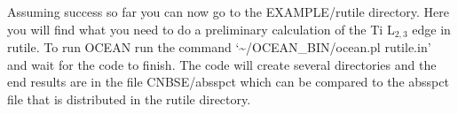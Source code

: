 \documentclass[11pt]{report}
\begin{document}
Assuming success so far you can now go to the EXAMPLE/rutile directory. Here you will find what you need to do a preliminary 
calculation of the Ti L$_{2,3}$ edge in rutile. To run OCEAN run the command `\textasciitilde/OCEAN\_BIN/ocean.pl rutile.in' 
and wait for the code to finish. The code will create several directories and the end results are in the file CNBSE/absspct which can 
be compared to the absspct file that is distributed in the rutile directory.  


\end{document}
